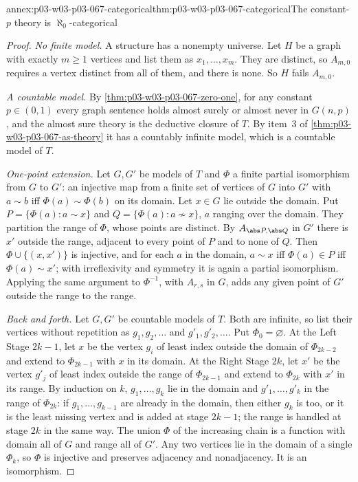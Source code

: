 \begin{annexitem}{annex:p03-w03-p03-067-categorical}{thm:p03-w03-p03-067-categorical}{The constant-\(p\) theory is \(\aleph_0\)-categorical}
\begin{proof}
\emph{No finite model.}  A structure has a nonempty universe.  Let \(H\) be
a graph with exactly \(m\geq1\) vertices and list them as
\(x_1,\ldots,x_m\).  They are distinct, so \(A_{m,0}\) requires a vertex
distinct from all of them, and there is none.  So \(H\) fails \(A_{m,0}\).

\emph{A countable model.}  By \cref{thm:p03-w03-p03-067-zero-one}, for any
constant \(p\in(0,1)\) every graph sentence holds almost surely or almost never
in \(G(n,p)\), and the almost sure theory is the deductive closure of \(T\).
By item~3 of \cref{thm:p03-w03-p03-067-as-theory} it has a countably infinite
model, which is a countable model of \(T\).

\emph{One-point extension.}  Let \(G,G'\) be models of \(T\) and \(\Phi\) a
finite partial isomorphism from \(G\) to \(G'\): an injective map from a
finite set of vertices of \(G\) into \(G'\) with \(a\sim b\) iff
\(\Phi(a)\sim\Phi(b)\) on its domain.  Let \(x\in G\) lie outside the domain.
Put \(P=\{\Phi(a):a\sim x\}\) and \(Q=\{\Phi(a):a\not\sim x\}\), \(a\)
ranging over the domain.  They partition the range of \(\Phi\), whose points
are distinct.  By \(A_{\abs P,\abs Q}\) in \(G'\) there is \(x'\) outside the
range, adjacent to every point of \(P\) and to none of \(Q\).  Then
\(\Phi\cup\{(x,x')\}\) is injective, and for each \(a\) in the domain,
\(a\sim x\) iff \(\Phi(a)\in P\) iff \(\Phi(a)\sim x'\); with irreflexivity
and symmetry it is again a partial isomorphism.  Applying the same argument
to \(\Phi^{-1}\), with \(A_{r,s}\) in \(G\), adds any given point of \(G'\)
outside the range to the range.

\emph{Back and forth.}  Let \(G,G'\) be countable models of \(T\).  Both are
infinite, so list their vertices without repetition as
\(g_1,g_2,\ldots\) and \(g'_1,g'_2,\ldots\).  Put \(\Phi_0=\varnothing\).  At
the Left Stage \(2k-1\), let \(x\) be the vertex \(g_i\) of least index outside
the domain of \(\Phi_{2k-2}\) and extend to \(\Phi_{2k-1}\) with \(x\) in its
domain.  At the Right Stage \(2k\), let \(x'\) be the vertex \(g'_j\) of least
index outside the range of \(\Phi_{2k-1}\) and extend to \(\Phi_{2k}\) with
\(x'\) in its range.  By induction on \(k\), \(g_1,\ldots,g_k\) lie in the
domain and \(g'_1,\ldots,g'_k\) in the range of \(\Phi_{2k}\): if
\(g_1,\ldots,g_{k-1}\) are already in the domain, then either \(g_k\) is
too, or it is the least missing vertex and is added at stage \(2k-1\); the
range is handled at stage \(2k\) in the same way.  The union \(\Phi\) of the
increasing chain is a function with domain all of \(G\) and range all of
\(G'\).  Any two vertices lie in the domain of a single \(\Phi_k\), so
\(\Phi\) is injective and preserves adjacency and nonadjacency.  It is an
isomorphism.


\end{proof}
\end{annexitem}
